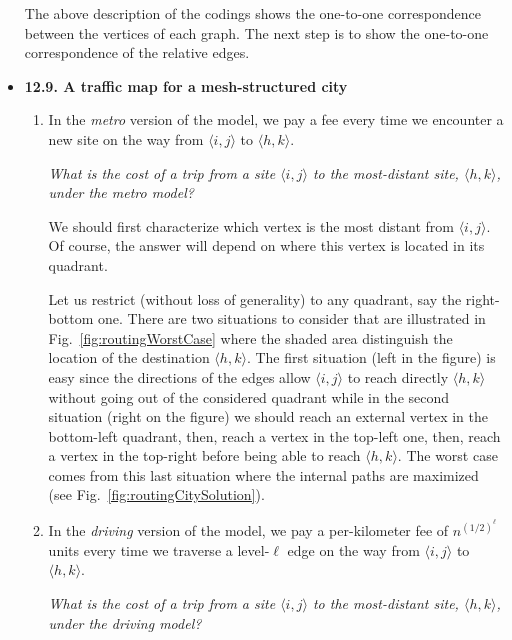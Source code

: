 \begin{itemize}
The above description of the codings shows the one-to-one correspondence between the vertices of each graph.
The next step is to show the one-to-one correspondence of the relative edges.


\medskip\item
{\bf 12.9. A traffic map for a mesh-structured city}
\smallskip


  \begin{enumerate}
  \item
In the {\em metro} version of the model, we pay a fee every time we encounter a new site on the way from $\langle i,j \rangle$ to $\langle h,k \rangle$.

\smallskip

{\em What is the cost of a trip from a site $\langle i,j \rangle$ to the most-distant site, $\langle h,k \rangle$, under the metro model?}
\smallskip

We should first characterize which vertex is the most distant from $\langle i,j \rangle$. 
Of course, the answer will depend on where this vertex is located in its quadrant.

Let us restrict (without loss of generality) to any quadrant, say the right-bottom one. 
There are two situations to consider that are illustrated in Fig.~\ref{fig:routingWorstCase}
where the shaded area distinguish the location of the destination $\langle h,k \rangle$.
The first situation (left in the figure) is easy since the directions of the edges allow $\langle i,j \rangle$ to reach directly $\langle h,k \rangle$
without going out of the considered quadrant while in the second situation (right on the figure) we should reach an external
vertex in the bottom-left quadrant, then, reach a vertex in the top-left one, then, reach a vertex in the top-right before being able to
reach $\langle h,k \rangle$.
The worst case comes from this last situation where the internal paths are maximized (see Fig.~\ref{fig:routingCitySolution}).

  \medskip\item
In the {\em driving} version of the model, we pay a per-kilometer fee of $n^{(1/2)^\ell}$ units every time we traverse a level-$\ell$ edge on the way from $\langle i,j \rangle$ to $\langle h,k \rangle$.
 \smallskip


{\em What is the cost of a trip from a site $\langle i,j \rangle$ to the most-distant site, $\langle h,k \rangle$, under the driving model?}
\smallskip


\end{enumerate}
\end{itemize}
